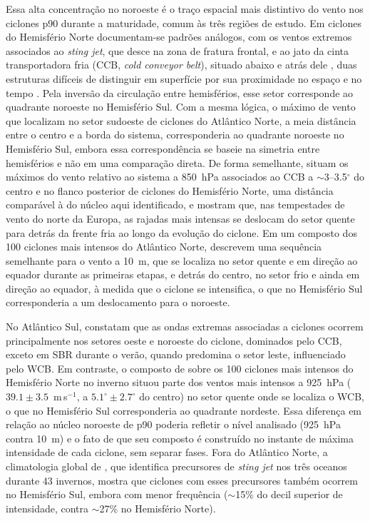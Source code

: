 Essa alta concentração no noroeste é o traço espacial mais distintivo do vento nos ciclones p90 durante a maturidade, comum às três regiões de estudo.
Em ciclones do Hemisfério Norte documentam-se padrões análogos, com os ventos extremos associados ao \textit{sting jet}, que desce na zona de fratura frontal, e ao jato da cinta transportadora fria (CCB, \textit{cold conveyor belt}), situado abaixo e atrás dele \citep{clark2005sting, clark2018sting}, duas estruturas difíceis de distinguir em superfície por sua proximidade no espaço e no tempo \citep{eisenstein2023identification}. Pela inversão da circulação entre hemisférios, esse setor corresponde ao quadrante noroeste no Hemisfério Sul.
Com a mesma lógica, o máximo de vento que \citet{rudeva2011composite} localizam no setor sudoeste de ciclones do Atlântico Norte, a meia distância entre o centro e a borda do sistema, corresponderia ao quadrante noroeste no Hemisfério Sul, embora essa correspondência se baseie na simetria entre hemisférios e não em uma comparação direta.
De forma semelhante, \citet{priestley2022improved} situam os máximos do vento relativo ao sistema a 850~hPa associados ao CCB a ${\sim}$3--3.5$^{\circ}$ do centro e no flanco posterior de ciclones do Hemisfério Norte, uma distância comparável à do núcleo aqui identificado, e \citet{laurila2021characteristics} mostram que, nas tempestades de vento do norte da Europa, as rajadas mais intensas se deslocam do setor quente para detrás da frente fria ao longo da evolução do ciclone. Em um composto dos 100 ciclones mais intensos do Atlântico Norte, \citet{gentile2025response} descrevem uma sequência semelhante para o vento a 10~m, que se localiza no setor quente e em direção ao equador durante as primeiras etapas, e detrás do centro, no setor frio e ainda em direção ao equador, à medida que o ciclone se intensifica, o que no Hemisfério Sul corresponderia a um deslocamento para o noroeste.

No Atlântico Sul, \citet{gramcianinov2023impact} constatam que as ondas extremas associadas a ciclones ocorrem principalmente nos setores oeste e noroeste do ciclone, dominados pelo CCB, exceto em SBR durante o verão, quando predomina o setor leste, influenciado pelo WCB.
Em contraste, o composto de \citet{catto2010climate} sobre os 100 ciclones mais intensos do Hemisfério Norte no inverno situou parte dos ventos mais intensos a 925~hPa (${39.1 \pm 3.5}$~m\,s$^{-1}$, a ${5.1^{\circ} \pm 2.7^{\circ}}$ do centro) no setor quente onde se localiza o WCB, o que no Hemisfério Sul corresponderia ao quadrante nordeste. Essa diferença em relação ao núcleo noroeste de p90 poderia refletir o nível analisado (925~hPa contra 10~m) e o fato de que seu composto é construído no instante de máxima intensidade de cada ciclone, sem separar fases.
Fora do Atlântico Norte, a climatologia global de \citet{gray2024global}, que identifica precursores de \textit{sting jet} nos três oceanos durante 43 invernos, mostra que ciclones com esses precursores também ocorrem no Hemisfério Sul, embora com menor frequência (${\sim}$15\% do decil superior de intensidade, contra ${\sim}$27\% no Hemisfério Norte).

